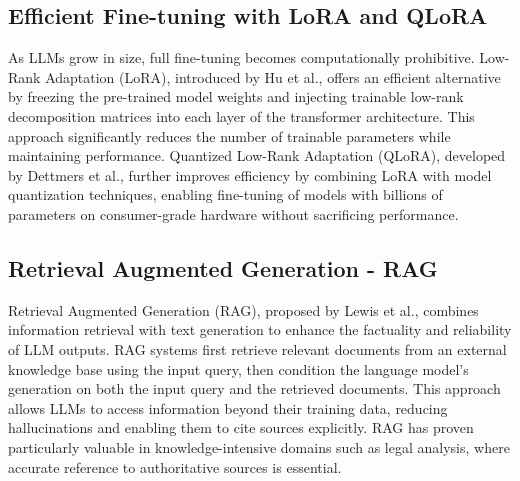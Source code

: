 \subsection{Efficient Fine-tuning with LoRA and QLoRA}
As LLMs grow in size, full fine-tuning becomes computationally prohibitive. 
Low-Rank Adaptation (LoRA), introduced by Hu et al.\cite{hu2021}, offers 
an efficient alternative by freezing the pre-trained model weights and 
injecting trainable low-rank decomposition matrices into each layer of 
the transformer architecture. This approach significantly reduces the 
number of trainable parameters while maintaining performance. Quantized 
Low-Rank Adaptation (QLoRA), developed by Dettmers et al.\cite{dettmers2023}, 
further improves efficiency by combining LoRA with model quantization techniques, 
enabling fine-tuning of models with billions of parameters on consumer-grade 
hardware without sacrificing performance.
\subsection{Retrieval Augmented Generation - RAG}
Retrieval Augmented Generation (RAG), proposed by Lewis et 
al.\cite{lewis2020retrieval}, combines information retrieval with text 
generation to enhance the factuality and reliability of LLM outputs. 
RAG systems first retrieve relevant documents from an external knowledge 
base using the input query, then condition the language model's generation 
on both the input query and the retrieved documents. This approach allows 
LLMs to access information beyond their training data, reducing 
hallucinations and enabling them to cite sources explicitly. 
RAG has proven particularly valuable in knowledge-intensive domains 
such as legal analysis, where accurate reference to authoritative 
sources is essential.

